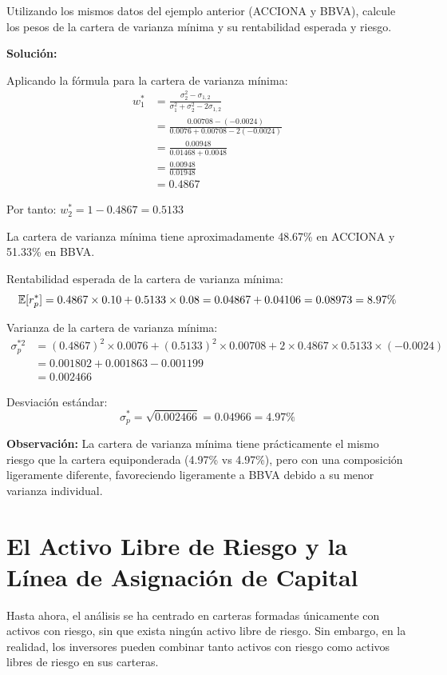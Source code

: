 \begin{ejemplo}
Utilizando los mismos datos del ejemplo anterior (ACCIONA y BBVA), calcule los pesos de la cartera de varianza mínima y su rentabilidad esperada y riesgo.

\textbf{Solución:}

Aplicando la fórmula para la cartera de varianza mínima:
\begin{align*}
w_1^* &= \frac{\sigma_2^2 - \sigma_{1,2}}{\sigma_1^2 + \sigma_2^2 - 2\sigma_{1,2}} \\
&= \frac{0.00708 - (-0.0024)}{0.0076 + 0.00708 - 2(-0.0024)} \\
&= \frac{0.00948}{0.01468 + 0.0048} \\
&= \frac{0.00948}{0.01948} \\
&= 0.4867
\end{align*}

Por tanto: $w_2^* = 1 - 0.4867 = 0.5133$

La cartera de varianza mínima tiene aproximadamente 48.67\% en ACCIONA y 51.33\% en BBVA.

Rentabilidad esperada de la cartera de varianza mínima:
$$\mathbb{E}[r_p^*] = 0.4867 \times 0.10 + 0.5133 \times 0.08 = 0.04867 + 0.04106 = 0.08973 = 8.97\%$$

Varianza de la cartera de varianza mínima:
\begin{align*}
\sigma_p^{*2} &= (0.4867)^2 \times 0.0076 + (0.5133)^2 \times 0.00708 + 2 \times 0.4867 \times 0.5133 \times (-0.0024) \\
&= 0.001802 + 0.001863 - 0.001199 \\
&= 0.002466
\end{align*}

Desviación estándar:
$$\sigma_p^* = \sqrt{0.002466} = 0.04966 = 4.97\%$$

\textbf{Observación:} La cartera de varianza mínima tiene prácticamente el mismo riesgo que la cartera equiponderada (4.97\% vs 4.97\%), pero con una composición ligeramente diferente, favoreciendo ligeramente a BBVA debido a su menor varianza individual.
\end{ejemplo}

\section{El Activo Libre de Riesgo y la Línea de Asignación de Capital}

Hasta ahora, el análisis se ha centrado en carteras formadas únicamente con activos con riesgo, sin que exista ningún activo libre de riesgo. Sin embargo, en la realidad, los inversores pueden combinar tanto activos con riesgo como activos libres de riesgo en sus carteras.

